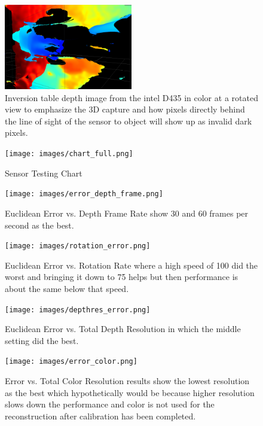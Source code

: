 \begin{figure}[h]
        \caption{Inversion table depth image from the intel D435 in color at a rotated view to emphasize the 3D capture and how pixels directly behind the line of sight of the sensor to object will show up as invalid dark pixels.}
        \centering
        \includegraphics[width=0.5\textwidth]{images/inversion_depth.png}
\end{figure}


\begin{figure}[h]
        \caption{Sensor Testing Chart}
        \centering
        \texttt{[image: images/chart\_full.png]}
\end{figure}
 
 
\begin{figure}[h]
        \caption{Euclidean Error vs. Depth Frame Rate show 30 and 60 frames per second as the best.}
        \centering
        \texttt{[image: images/error\_depth\_frame.png]}
\end{figure}
  
\begin{figure}[h]
        \caption{Euclidean Error vs. Rotation Rate where a high speed of 100 did the worst and bringing it down to 75 helps but then performance is about the same below that speed.}
        \centering
        \texttt{[image: images/rotation\_error.png]}
\end{figure}
  
\begin{figure}[h]
        \caption{Euclidean Error vs. Total Depth Resolution in which the middle setting did the best.}
        \centering
        \texttt{[image: images/depthres\_error.png]}
\end{figure}

\begin{figure}[h]
        \caption{Error vs. Total Color Resolution results show the lowest resolution as the best which hypothetically would be because higher resolution slows down the performance and color is not used for the reconstruction after calibration has been completed.}
        \centering
        \texttt{[image: images/error\_color.png]}
\end{figure}
 

